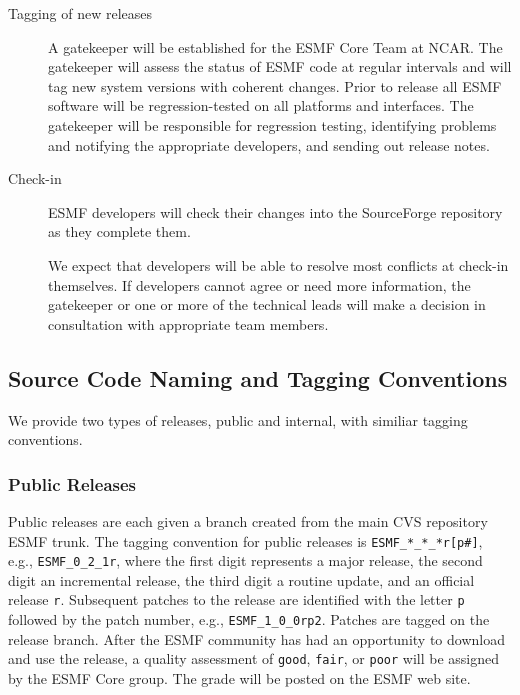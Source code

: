 \begin{description}

\item [Tagging of new releases]  A gatekeeper will be established for the 
ESMF Core Team at NCAR.  The gatekeeper will assess the 
status of ESMF code at regular intervals and will tag new 
system versions with coherent changes.  Prior to release all ESMF software 
will be regression-tested on all platforms and interfaces.  The gatekeeper 
will be responsible for regression testing, identifying problems and 
notifying the appropriate developers, and sending out release notes. 

\item [Check-in] ESMF developers will check their changes into the 
SourceForge repository as they complete them.  

We expect that developers will be able to resolve most conflicts 
at check-in themselves. If developers cannot agree or need more information,
the gatekeeper or one or more of the technical leads will make a decision
in consultation with appropriate team members.

\end{description}

\subsection{Source Code Naming and Tagging Conventions}
\label{sec:tagging}

We provide two types of releases, public and internal, with similiar tagging conventions.

\subsubsection{Public Releases}
Public releases are each given a branch created from the main CVS repository ESMF trunk. The tagging convention
for public releases is 
{\tt ESMF\_*\_*\_*r[p\#]}, e.g., {\tt ESMF\_0\_2\_1r}, where the first digit represents a major release, the 
second digit an incremental release, the third digit a routine update, and an official release {\tt r}.
Subsequent patches to the release are identified with the letter {\tt p} followed by the patch number,
e.g., {\tt ESMF\_1\_0\_0rp2}. Patches are tagged on the release branch.
After the ESMF community has had an opportunity to download and use the release, a quality assessment
of {\tt good}, {\tt fair}, or {\tt poor} will be assigned by the ESMF Core group.  The grade will 
be posted on the ESMF web site.

